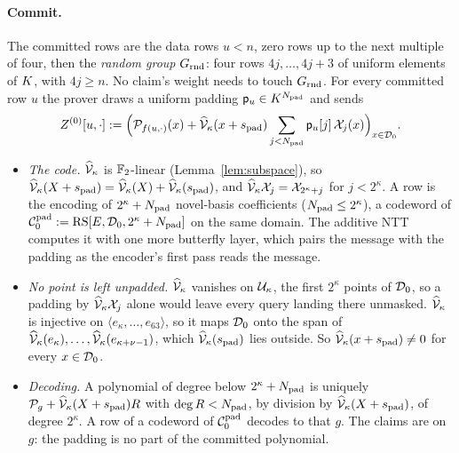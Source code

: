 \paragraph{Commit.} The committed rows are the data rows $u < n$, zero rows up to the next multiple of four, then the \emph{random group} $G_{\mathrm{rnd}}$: four rows $4j, \dots, 4j + 3$ of uniform elements of $K$, with $4j \ge n$. No claim's weight needs to touch $G_{\mathrm{rnd}}$. For every committed row $u$ the prover draws a uniform padding $\mathsf{p}_u \in K^{N_{\mathrm{pad}}}$ and sends
\[
Z^{(0)}[u, \cdot] := \Bigl(\mathcal{P}_{f(u, \cdot)}(x) + \widehat{\mathcal{V}}_{\kappa}(x + s_{\mathrm{pad}}) \sum_{j < N_{\mathrm{pad}}} \mathsf{p}_u[j]\, \mathcal{X}_j(x)\Bigr)_{x \in \mathcal{D}_0}.
\]
\begin{itemize}[itemsep=1pt,topsep=2pt]
\item \emph{The code.} $\widehat{\mathcal{V}}_{\kappa}$ is $\mathbb{F}_2$-linear (Lemma~\ref{lem:subspace}), so $\widehat{\mathcal{V}}_{\kappa}(X + s_{\mathrm{pad}}) = \widehat{\mathcal{V}}_{\kappa}(X) + \widehat{\mathcal{V}}_{\kappa}(s_{\mathrm{pad}})$, and $\widehat{\mathcal{V}}_{\kappa} \mathcal{X}_j = \mathcal{X}_{2^\kappa + j}$ for $j < 2^\kappa$. A row is the encoding of $2^\kappa + N_{\mathrm{pad}}$ novel-basis coefficients ($N_{\mathrm{pad}} \le 2^\kappa$), a codeword of $\mathcal{C}^{\mathrm{pad}}_0 := \mathrm{RS}[E, \mathcal{D}_0, 2^\kappa + N_{\mathrm{pad}}]$ on the same domain. The additive NTT computes it with one more butterfly layer, which pairs the message with the padding as the encoder's first pass reads the message.
\item \emph{No point is left unpadded.} $\widehat{\mathcal{V}}_{\kappa}$ vanishes on $\mathcal{U}_\kappa$, the first $2^\kappa$ points of $\mathcal{D}_0$, so a padding by $\widehat{\mathcal{V}}_{\kappa} \mathcal{X}_j$ alone would leave every query landing there unmasked. $\widehat{\mathcal{V}}_{\kappa}$ is injective on $\langle e_\kappa, \dots, e_{63} \rangle$, so it maps $\mathcal{D}_0$ onto the span of $\widehat{\mathcal{V}}_{\kappa}(e_\kappa), \dots, \widehat{\mathcal{V}}_{\kappa}(e_{\kappa + \nu - 1})$, which $\widehat{\mathcal{V}}_{\kappa}(s_{\mathrm{pad}})$ lies outside. So $\widehat{\mathcal{V}}_{\kappa}(x + s_{\mathrm{pad}}) \neq 0$ for every $x \in \mathcal{D}_0$.
\item \emph{Decoding.} A polynomial of degree below $2^\kappa + N_{\mathrm{pad}}$ is uniquely $\mathcal{P}_g + \widehat{\mathcal{V}}_{\kappa}(X + s_{\mathrm{pad}}) R$ with $\deg R < N_{\mathrm{pad}}$, by division by $\widehat{\mathcal{V}}_{\kappa}(X + s_{\mathrm{pad}})$, of degree $2^\kappa$. A row of a codeword of $\mathcal{C}^{\mathrm{pad}}_0$ decodes to that $g$. The claims are on $g$: the padding is no part of the committed polynomial.
\end{itemize}

